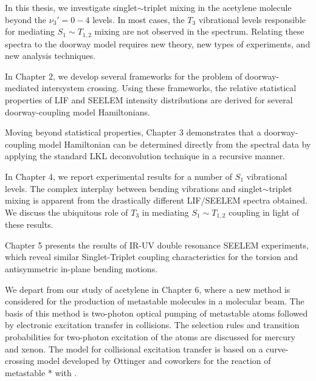 In this thesis, we investigate singlet$\sim$triplet mixing in the
acetylene molecule beyond the $\nu_3'=0-4$ levels.  In most cases, the
$T_3$ vibrational levels responsible for mediating $S_1 \sim T_{1,2}$
mixing are not observed in the spectrum.  Relating these spectra to
the doorway model requires new theory, new types of experiments, and
new analysis techniques.

In Chapter 2, we develop several frameworks for the problem of
doorway-mediated intersystem crossing.  Using these frameworks, the
relative statistical properties of LIF and SEELEM intensity
distributions are derived for several doorway-coupling model
Hamiltonians.

Moving beyond statistical properties, Chapter 3 demonstrates that a
doorway-coupling model Hamiltonian can be determined directly from the
spectral data by applying the standard LKL deconvolution technique in
a recursive manner.


In Chapter 4, we report experimental results for a number of $S_1$
vibrational levels.  The complex interplay between bending vibrations
and singlet$\sim$triplet mixing is apparent from the drastically
different LIF/SEELEM spectra obtained.  We discuss the ubiquitous role
of $T_3$ in mediating $S_1 \sim T_{1,2}$ coupling in light of these
results.

Chapter 5 presents the results of IR-UV double resonance SEELEM
experiments, which reveal similar Singlet-Triplet coupling
characteristics for the torsion and antisymmetric in-plane bending
motions.

We depart from our study of acetylene in Chapter 6, where a new method
is considered for the production of metastable molecules in a
molecular beam.  The basis of this method is two-photon optical
pumping of metastable atoms followed by electronic excitation transfer
in collisions.  The selection rules and transition probabilities for
two-photon excitation of the atoms are discussed for mercury and
xenon.  The model for collisional excitation transfer is based on a
curve-crossing model developed by Ottinger and coworkers for the
reaction of metastable * with .  

